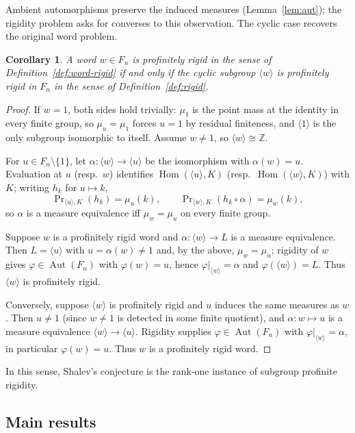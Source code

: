 \documentclass[11pt]{amsart}
\theoremstyle{plain}
\newtheorem{corollary}[theorem]{Corollary}
\theoremstyle{definition}
\newcommand{\Hom}{\operatorname{Hom}}
\newcommand{\Aut}{\operatorname{Aut}}
\begin{document}
Ambient automorphisms preserve the induced measures
(Lemma~\ref{lem:aut}); the rigidity problem asks for converses to this
observation. The cyclic case recovers the original word problem.
\begin{corollary}\label{cor:word-cyclic}
A word $w\in F_n$ is profinitely rigid in the sense of
Definition~\ref{def:word-rigid} if and only if the cyclic subgroup
$\langle w\rangle$ is profinitely rigid in $F_n$ in the sense of
Definition~\ref{def:rigid}.
\end{corollary}
\begin{proof}
If $w=1$, both sides hold trivially: $\mu_1$ is the point mass at the identity
in every finite group, so $\mu_u=\mu_1$ forces $u=1$ by residual finiteness,
and $\langle1\rangle$ is the only subgroup isomorphic to itself. Assume
$w\neq1$, so $\langle w\rangle\cong\mathbb Z$.

For $u\in F_n\setminus\{1\}$, let $\alpha\colon\langle w\rangle\to\langle
u\rangle$ be the isomorphism with $\alpha(w)=u$. Evaluation at $u$ (resp.\ $w$)
identifies $\Hom(\langle u\rangle,K)$ (resp.\ $\Hom(\langle w\rangle,K)$) with
$K$; writing $h_k$ for $u\mapsto k$,
\[
  \Pr\nolimits_{\langle u\rangle,K}(h_k)=\mu_u(k),
  \qquad
  \Pr\nolimits_{\langle w\rangle,K}(h_k\circ\alpha)=\mu_w(k),
\]
so $\alpha$ is a measure equivalence iff $\mu_w=\mu_u$ on every finite group.

Suppose $w$ is a profinitely rigid word and $\alpha\colon\langle w\rangle\to L$
is a measure equivalence. Then $L=\langle u\rangle$ with $u=\alpha(w)\neq1$ and,
by the above, $\mu_w=\mu_u$; rigidity of $w$ gives $\varphi\in\Aut(F_n)$ with
$\varphi(w)=u$, hence $\varphi|_{\langle w\rangle}=\alpha$ and
$\varphi(\langle w\rangle)=L$. Thus $\langle w\rangle$ is profinitely rigid.

Conversely, suppose $\langle w\rangle$ is profinitely rigid and $u$ induces the
same measures as $w$. Then $u\neq1$ (since $w\neq1$ is detected in some finite
quotient), and $\alpha\colon w\mapsto u$ is a measure equivalence
$\langle w\rangle\to\langle u\rangle$. Rigidity supplies $\varphi\in\Aut(F_n)$
with $\varphi|_{\langle w\rangle}=\alpha$, in particular $\varphi(w)=u$. Thus
$w$ is a profinitely rigid word.
\end{proof}
In this sense, Shalev's conjecture is the rank-one instance of subgroup
profinite rigidity.

\subsection{Main results}\label{sec:main-results}
\end{document}
